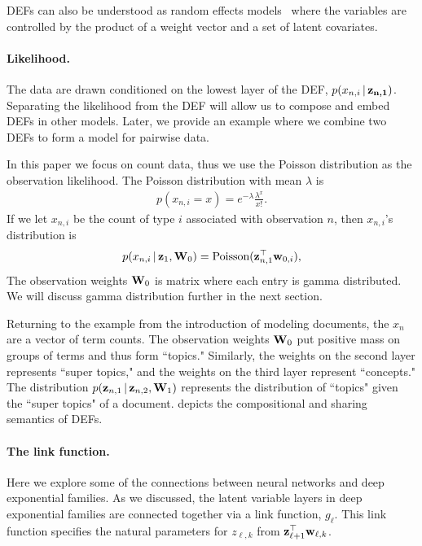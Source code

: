 \documentclass[twoside]{article}
\begin{document}
DEFs can also be understood as random effects models~\cite{gelman2013bayesian} where the variables are controlled by the product of a weight vector and a set of latent covariates.

\paragraph{Likelihood.}
The data are drawn conditioned on the lowest layer of the DEF, 
$p(x_{n,i} \,\vert\, \boldsymbol{\mathbf{z_{n,1}}})$. Separating the likelihood from the
DEF will allow us to compose and embed DEFs in other models.
Later, we provide an example where we combine two DEFs to 
form a model for pairwise data.

In this paper we focus on count data, thus
we use the Poisson distribution as the observation likelihood. The Poisson
distribution with mean $\lambda$ is
\begin{align*}
p(x_{n, i} = x) = e^{-\lambda} \frac{\lambda^{x}}{x!}.
\end{align*}
If we let $x_{n, i}$ be the count of type $i$ associated with 
observation $n$, then $x_{n, i}$'s distribution is
\begin{align*}
 p(x_{n,i} \,\vert\, \boldsymbol{\mathbf{z}}_{1}, \boldsymbol{\mathbf{W}}_{0}) = \textrm{Poisson}(\boldsymbol{\mathbf{z}}_{n, 1}^\top \boldsymbol{\mathbf{w}}_{0, i}),
\end{align*}
The observation weights $\boldsymbol{\mathbf{W}}_{0}$ is matrix where each entry is gamma distributed. We 
will discuss gamma distribution further in the next section.

Returning to the example from the introduction of modeling documents,
the $x_n$ are a vector of term counts. The observation weights
$\boldsymbol{\mathbf{W}}_0$ put positive mass on groups of terms and thus form ``topics."
Similarly, the weights on the second layer represents ``super topics," and 
the weights on the third layer represent ``concepts."
The distribution $p(\boldsymbol{\mathbf{z}}_{n, 1} \,\vert\, \boldsymbol{\mathbf{z}}_{n,2}, \boldsymbol{\mathbf{W}}_1)$ represents the distribution of
``topics" given the ``super topics" of a document. 
depicts the compositional and sharing semantics of DEFs. 


\paragraph{The link function.}

Here we explore some of the connections between neural networks and deep 
exponential families.
As we discussed, the latent variable layers in deep exponential families are connected together via a
link function, $g_\ell$. This link function specifies the natural parameters for $z_{\ell, k}$ from 
$\boldsymbol{\mathbf{z}}_{\ell+1}^\top \boldsymbol{\mathbf{w}}_{\ell, k}$.
\end{document}

